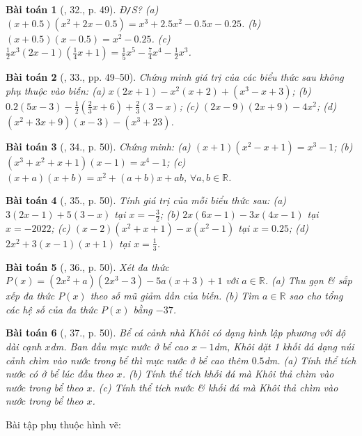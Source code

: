 \documentclass{article}
\newtheorem{baitoan}{Bài toán}
\begin{document}
\begin{baitoan}[\cite{SBT_Toan_7_Canh_Dieu_tap_2}, 32., p. 49]
	\emph{Đ\texttt{/}S?} (a) $(x + 0.5)(x^2 + 2x - 0.5) = x^3 + 2.5x^2 - 0.5x - 0.25$. (b) $(x + 0.5)(x - 0.5) = x^2  - 0.25$. (c) $\frac{1}{2}x^3(2x - 1)\left(\frac{1}{4}x + 1\right) = \frac{1}{5}x^5 - \frac{7}{4}x^4 - \frac{1}{2}x^3$.
\end{baitoan}

\begin{baitoan}[\cite{SBT_Toan_7_Canh_Dieu_tap_2}, 33., pp. 49--50]
	Chứng minh giá trị của các biểu thức sau không phụ thuộc vào biến: (a) $x(2x + 1) - x^2(x + 2) + (x^3 - x + 3)$; (b) $0.2(5x - 3) - \frac{1}{2}\left(\frac{2}{3}x + 6\right) + \frac{2}{3}(3 - x)$; (c) $(2x - 9)(2x + 9) - 4x^2$; (d) $(x^2 + 3x + 9)(x - 3) - (x^3 + 23)$.
\end{baitoan}

\begin{baitoan}[\cite{SBT_Toan_7_Canh_Dieu_tap_2}, 34., p. 50]
	Chứng minh: (a) $(x + 1)(x^2 - x + 1) = x^3 - 1$; (b) $(x^3 + x^2 + x + 1)(x - 1) = x^4 - 1$; (c) $(x + a)(x + b) = x^2 + (a + b)x + ab$, $\forall a,b\in\mathbb{R}$.
\end{baitoan}

\begin{baitoan}[\cite{SBT_Toan_7_Canh_Dieu_tap_2}, 35., p. 50]
	Tính giá trị của mỗi biểu thức sau: (a) $3(2x - 1) + 5(3 - x)$ tại $x = -\frac{3}{2}$; (b) $2x(6x - 1) - 3x(4x - 1)$ tại $x = -2022$; (c) $(x - 2)(x^2 + x + 1) - x(x^2 - 1)$ tại $x = 0.25$; (d) $2x^2 + 3(x - 1)(x + 1)$ tại $x = \frac{1}{3}$.
\end{baitoan}

\begin{baitoan}[\cite{SBT_Toan_7_Canh_Dieu_tap_2}, 36., p. 50]
	Xét đa thức $P(x) = (2x^2 + a)(2x^3 - 3) - 5a(x + 3) + 1$ với $a\in\mathbb{R}$. (a) Thu gọn \& sắp xếp đa thức $P(x)$ theo số mũ giảm dần của biến. (b) Tìm $a\in\mathbb{R}$ sao cho tổng các hệ số của đa thức $P(x)$ bằng $-37$.
\end{baitoan}

\begin{baitoan}[\cite{SBT_Toan_7_Canh_Dieu_tap_2}, 37., p. 50]
	Bể cá cảnh nhà Khôi có dạng hình lập phương với độ dài cạnh $x$\emph{dm}. Ban đầu mực nước ở bể cao $x - 1$\emph{dm}, Khôi đặt 1 khối đá dạng núi cảnh chìm vào nước trong bể thì mực nước ở bể cao thêm $0.5$\emph{dm}. (a) Tính thể tích nước có ở bể lúc đầu theo $x$. (b) Tính thể tích khối đá mà Khôi thả chìm vào nước trong bể theo $x$. (c) Tính thể tích nước \& khối đá mà Khôi thả chìm vào nước trong bể theo $x$.
\end{baitoan}
Bài tập phụ thuộc hình vẽ: \cite[38., p. 50]{SBT_Toan_7_Canh_Dieu_tap_2}
\end{document}
